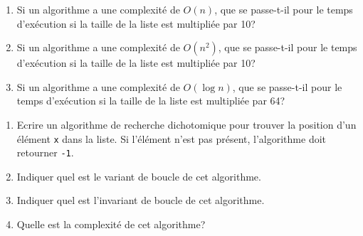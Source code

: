 \documentclass[11pt, a4paper]{report}
\begin{document}
\def\level{Premiere}  %
\def\course{NSI}
\def\chaptername{Les algorithmes de recherche} %
\def\docname{LP06~--~TD 1}        %

\pagestyle{DS_LP}

\NomPrenom{}

\begin{exercice_cours}{}
    
    \begin{enumerate}
        \item Si un algorithme a une complexité de $O(n)$, que se passe-t-il pour le temps d'exécution si la taille de la liste est multipliée par 10? \hfill
        \item Si un algorithme a une complexité de $O(n^2)$, que se passe-t-il pour le temps d'exécution si la taille de la liste est multipliée par 10? \hfill
        \item Si un algorithme a une complexité de $O(\log n)$, que se passe-t-il pour le temps d'exécution si la taille de la liste est multipliée par 64? \hfill
    \end{enumerate}   
\end{exercice_cours}

\begin{exercice_cours}
    
    \begin{enumerate}
        \item     Ecrire un algorithme de recherche dichotomique pour trouver la position d'un élément \verb|x| dans la liste. Si l'élément n'est pas présent, l'algorithme doit retourner \verb|-1|.


\item Indiquer quel est le variant de boucle de cet algorithme. \hfill{}
    \item Indiquer quel est l'invariant de boucle de cet algorithme. \hfill
    
    \item Quelle est la complexité de cet algorithme? \hfill{}  


    \end{enumerate}

\end{exercice_cours}
\end{document}
